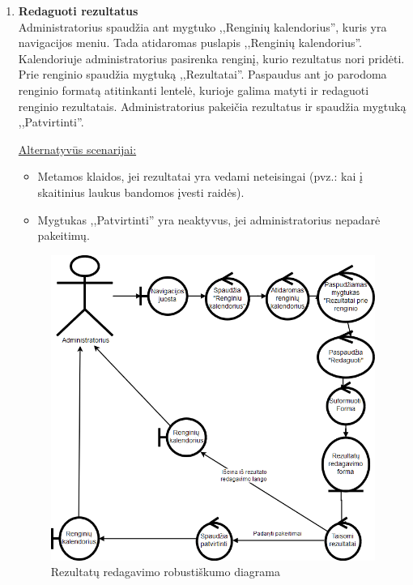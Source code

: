 \documentclass{VUMIFPSkursinis}
\begin{document}
\begin{enumerate} [label = \textbf{U\arabic*.}]
			\item \textbf{Redaguoti rezultatus}   \\
					Administratorius spaudžia ant mygtuko ,,Renginių kalendorius'', kuris yra navigacijos meniu. Tada atidaromas puslapis ,,Renginių kalendorius''. Kalendoriuje administratorius pasirenka renginį, kurio rezultatus nori pridėti. Prie renginio spaudžia mygtuką ,,Rezultatai''. Paspaudus ant jo parodoma renginio formatą atitinkanti lentelė, kurioje galima matyti ir redaguoti renginio rezultatais. Administratorius pakeičia rezultatus ir spaudžia mygtuką ,,Patvirtinti''.
					
					\underline{Alternatyvūs scenarijai:}
					\begin{itemize}
						\item Metamos klaidos, jei rezultatai yra vedami neteisingai (pvz.: kai į skaitinius laukus bandomos įvesti raidės).
						\item Mygtukas ,,Patvirtinti'' yra neaktyvus, jei administratorius nepadarė pakeitimų.
					\end{itemize}
					
					\begin{figure}[H]
						\centering
						\includegraphics[width=\textwidth]{img/PSI5/u26.png}
						\caption{Rezultatų redagavimo robustiškumo diagrama}
						\label{draw:u26}
					\end{figure}
				

\end{enumerate}
\end{document}
